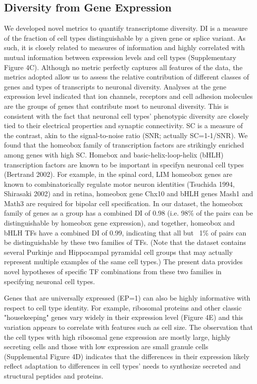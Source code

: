 \subsection{Diversity from Gene Expression}
We developed novel metrics to quantify transcriptome diversity. DI is a measure of the fraction of cell types distinguishable by a given gene or splice variant. As such, it is closely related to measures of information and highly correlated with mutual information between expression levels and cell types (Supplementary Figure 4C). Although no metric perfectly captures all features of the data, the metrics adopted allow us to assess the relative contribution of different classes of genes and types of transcripts to neuronal diversity. Analyses at the gene expression level indicated that ion channels, receptors and cell adhesion molecules are the groups of genes that contribute most to neuronal diversity. This is consistent with the fact that neuronal cell types' phenotypic diversity are closely tied to their electrical properties and synaptic connectivity. SC is a measure of the contrast, akin to the signal-to-noise ratio (SNR; actually SC=1-1/SNR). We found that the homeobox family of transcription factors are strikingly enriched among genes with high SC. Homebox and basic-helix-loop-helix (bHLH) transcription factors are known to be important in specifyn neuronal cell types (Bertrand 2002). For example, in the spinal cord, LIM homeobox genes are known to combinatorically regulate motor neuron identities (Tsuchida 1994, Shirasaki 2002) and in retina, homeobox gene Chx10 and bHLH genes Mash1 and Math3 are required for bipolar cell specification. In our dataset, the homeobox family of genes as a group has a combined DI of 0.98 (i.e. 98\% of the pairs can be distinguishable by homeobox gene expression), and together, homeobox and bHLH TFs have a combined DI of 0.99, indicating that all but ~1\% of pairs can be distinguishable by these two families of TFs. (Note that the dataset contains several Purkinje and Hippocampal pyramidal cell groups that may actually represent multiple examples of the same cell types.) The present data provides novel hypotheses of specific TF combinations from these two families in specifying neuronal cell types.

Genes that are universally expressed (EP=1) can also be highly informative with respect to cell type identity. For example, ribosomal proteins and other classic "housekeeping" genes vary widely in their expression level (Figure 4E) and this variation appears to correlate with features such as cell size. The observation that the cell types with high ribosomal gene expression are mostly large, highly secreting cells and those with low expression are small granule cells (Supplemental Figure 4D) indicates that the differences in their expression likely reflect adaptation to differences in cell types' needs to synthesize secreted and structural peptides and proteins.

